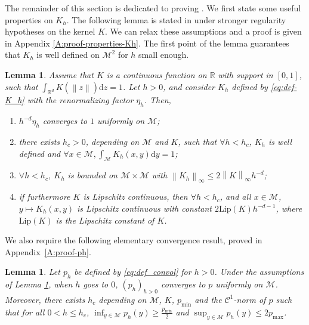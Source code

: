 \documentclass[10pt,a4paper]{article}
\newcommand\cC{\mathcal{C}}
\newcommand\cM{\mathcal{M}}
\newcommand\dR{\mathbb{R}}
\newcommand\dd{\mathrm{d}}
\newcommand{\NRM}[1]{{{\left\| #1\right\|}}} %
\newcommand{\PAR}[1]{{{\left(#1\right)}}} %
\newtheorem{lemma}[theorem]{Lemma}
\begin{document}
The remainder of this section is dedicated to proving . 
We first state some useful properties on $K_h$. The following lemma is stated in \cite[Lemma 10]{Divol2022} under stronger regularity hypotheses on the kernel $K$. We can relax these assumptions and a proof is given in Appendix \ref{A:proof-properties-Kh}. The first point of the lemma  guarantees  that $K_h$ is well defined on $\cM^2$ for $h$ small enough. 


\begin{lemma}\label{lem:properties-Kh}
Assume that $K$ is a continuous function on $\dR$ with support in $[0,1]$, such that $\int_{\dR^d}K(\NRM{z})\dd z=1$. Let $h>0$, and consider $K_h$ defined by \eqref{eq:def-K_h} with the renormalizing factor $\eta_h$. Then,
\begin{enumerate}[label=(\roman*)]
\item $h^{-d}\eta_h$ converges to $1$ uniformly on $\cM$;
\item {there exists $h_c>0$, depending on $\cM$ and $K$, such that $\forall h<h_c$, $K_h$ is well defined and} $\forall x\in \cM, \displaystyle{\int_\cM K_h(x,y)\dd y=1}$; 
\item  $\forall h<h_c$, $K_h$ is bounded on $\cM\times \cM$ with  $\NRM{K_h}_\infty\le 2\NRM{K}_\infty h^{-d}$;
\item if furthermore $K$ is Lipschitz continuous, then $\forall h<h_c$, and all $x\in \cM$,  $y\mapsto K_h(x,y)$ is Lipschitz continuous with constant $2\mathrm{Lip}(K)h^{-d-1}$, where $\mathrm{Lip}(K)$ is the Lipschitz constant of $K$.
\end{enumerate}
\end{lemma}

We also require the following elementary convergence result,
proved in Appendix~\ref{A:proof-ph}.

\begin{lemma}\label{lem:ph-to-p}
Let $p_h$ be defined by \eqref{eq:def_convol} for $h>0$. Under the assumptions of Lemma \ref{lem:properties-Kh}, when $h$ goes to $0$, $\PAR{p_h}_{h>0}$ converges to $p$ uniformly  on $\cM$. Moreover, there exists $h_c$ depending on $\cM$, $K$, $p_{\min}$ and the $\cC^1$-norm of $p$ such that for all $0<h\le h_c$, 
$\inf_{y\in\cM}p_h(y)\ge \frac{p_{\min}}{2}$ and $\sup_{y\in \cM} p_h(y)\le 2p_{\max}$.
\end{lemma}
\end{document}

